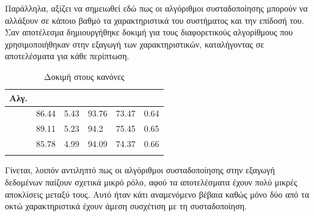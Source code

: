 Παράλληλα, αξίζει να σημειωθεί εδώ πως οι αλγόριθμοι συσταδοποίησης μπορούν να αλλάξουν σε κάποιο βαθμό τα χαρακτηριστικά του συστήματος και την επίδοσή του. Σαν αποτέλεσμα δημιουργήθηκε δοκιμή για τους διαφορετικούς αλγορίθμους που χρησιμοποιήθηκαν στην εξαγωγή των χαρακτηριστικών, καταλήγοντας σε αποτελέσματα για κάθε περίπτωση.
\begin{center}
\begin{longtabu} to 0.8\textwidth { | X[c] || X[c] | X[c] | X[c] | X[c] | X[c] |  }
 \hline
 Αλγ.&   &  &  &  & \\
\hline
  & 86.44	&	5.43 &	93.76 &	73.47 &	0.64\\
\hline
 & 89.11	&	5.23 &	94.2 &	75.45 &	0.65\\ 
 \hline
   & 85.78	&	4.99 &	94.09 &	74.37 &	0.66\\
\hline
\caption{Δοκιμή στους κανόνες}
\label{tab:testrules}
\end{longtabu}
\end{center}
Γίνεται, λοιπόν αντιληπτό πως οι αλγόριθμοι συσταδοποίησης στην εξαγωγή δεδομένων παίζουν σχετικά μικρό ρόλο, αφού τα αποτελέσματα έχουν πολύ μικρές αποκλίσεις μεταξύ τους. Αυτό ήταν κάτι αναμενόμενο βέβαια καθώς μόνο δύο από τα οκτώ χαρακτηριστικά έχουν άμεση συσχέτιση με τη συσταδοποίηση.\par
